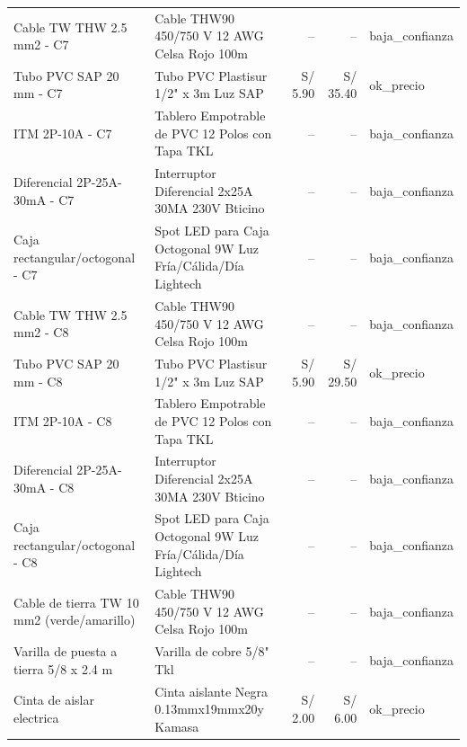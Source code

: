 \documentclass[11pt,a4paper]{article}
\begin{document}
\begin{longtable}{p{} p{} r r p{}}
Cable TW THW 2.5 mm2 - C7 & Cable THW90 450/750 V 12 AWG Celsa Rojo 100m & -- & -- & baja\_confianza \\
Tubo PVC SAP 20 mm - C7 & Tubo PVC Plastisur 1/2" x 3m Luz SAP & S/ 5.90 & S/ 35.40 & ok\_precio \\
ITM 2P-10A - C7 & Tablero Empotrable de PVC 12 Polos con Tapa TKL & -- & -- & baja\_confianza \\
Diferencial 2P-25A-30mA - C7 & Interruptor Diferencial 2x25A 30MA 230V Bticino & -- & -- & baja\_confianza \\
Caja rectangular/octogonal - C7 & Spot LED para Caja Octogonal 9W Luz Fría/Cálida/Día Lightech & -- & -- & baja\_confianza \\
Cable TW THW 2.5 mm2 - C8 & Cable THW90 450/750 V 12 AWG Celsa Rojo 100m & -- & -- & baja\_confianza \\
Tubo PVC SAP 20 mm - C8 & Tubo PVC Plastisur 1/2" x 3m Luz SAP & S/ 5.90 & S/ 29.50 & ok\_precio \\
ITM 2P-10A - C8 & Tablero Empotrable de PVC 12 Polos con Tapa TKL & -- & -- & baja\_confianza \\
Diferencial 2P-25A-30mA - C8 & Interruptor Diferencial 2x25A 30MA 230V Bticino & -- & -- & baja\_confianza \\
Caja rectangular/octogonal - C8 & Spot LED para Caja Octogonal 9W Luz Fría/Cálida/Día Lightech & -- & -- & baja\_confianza \\
Cable de tierra TW 10 mm2 (verde/amarillo) & Cable THW90 450/750 V 12 AWG Celsa Rojo 100m & -- & -- & baja\_confianza \\
Varilla de puesta a tierra 5/8 x 2.4 m & Varilla de cobre 5/8" Tkl & -- & -- & baja\_confianza \\
Cinta de aislar electrica & Cinta aislante Negra 0.13mmx19mmx20y Kamasa & S/ 2.00 & S/ 6.00 & ok\_precio \\
\bottomrule\end{longtable}
\end{document}
